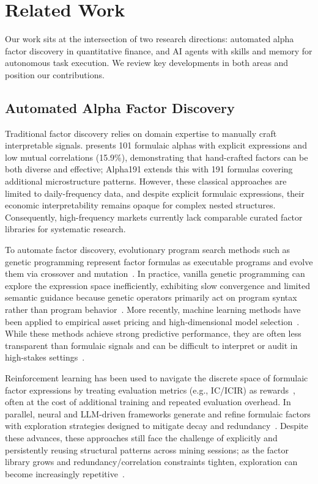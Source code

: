 \documentclass[sigconf]{acmart}
\begin{document}
\section{Related Work}

Our work sits at the intersection of two research directions: automated alpha factor discovery in quantitative finance, and AI agents with skills and memory for autonomous task execution. We review key developments in both areas and position our contributions.

\subsection{Automated Alpha Factor Discovery}

Traditional factor discovery relies on domain expertise to manually craft interpretable signals. \citet{kakushadze2016alphas} presents 101 formulaic alphas with explicit expressions and low mutual correlations (15.9\%), demonstrating that hand-crafted factors can be both diverse and effective; Alpha191 extends this with 191 formulas covering additional microstructure patterns. However, these classical approaches are limited to daily-frequency data, and despite explicit formulaic expressions, their economic interpretability remains opaque for complex nested structures. Consequently, high-frequency markets currently lack comparable curated factor libraries for systematic research.

To automate factor discovery, evolutionary program search methods such as genetic programming represent factor formulas as executable programs and evolve them via crossover and mutation~\citep{koza1992genetic,neely1997technical,allen1999genetic}. In practice, vanilla genetic programming can explore the expression space inefficiently, exhibiting slow convergence and limited semantic guidance because genetic operators primarily act on program syntax rather than program behavior~\citep{poli2008fieldguide,moraglio2012geometric}. More recently, machine learning methods have been applied to empirical asset pricing and high-dimensional model selection~\citep{gu2020mlassetpricing,kozak2020shrinking,feng2020taming}. While these methods achieve strong predictive performance, they are often less transparent than formulaic signals and can be difficult to interpret or audit in high-stakes settings~\citep{rudin2019stop}.

Reinforcement learning has been used to navigate the discrete space of formulaic factor expressions by treating evaluation metrics (e.g., IC/ICIR) as rewards~\citep{yu2023alphagen,zhao2025quantfactor}, often at the cost of additional training and repeated evaluation overhead. In parallel, neural and {LLM}-driven frameworks generate and refine formulaic factors with exploration strategies designed to mitigate decay and redundancy~\citep{shi2024alphaforge,tang2025alphaagent}. Despite these advances, these approaches still face the challenge of explicitly and persistently reusing structural patterns across mining sessions; as the factor library grows and redundancy/correlation constraints tighten, exploration can become increasingly repetitive~\citep{feng2020taming,kozak2020shrinking}.
\end{document}
